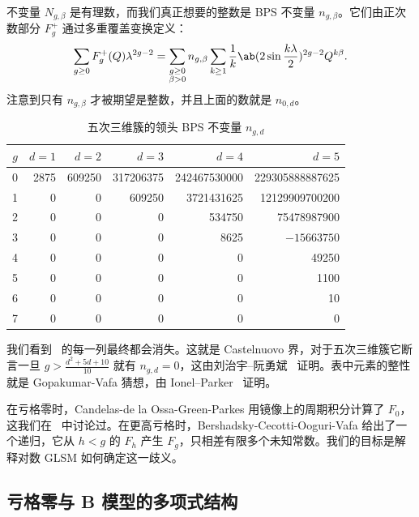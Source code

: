 \documentclass{amsart}
\theoremstyle{definition}
\theoremstyle{remark}
\theoremstyle{plain}
\theoremstyle{definition}
\theoremstyle{remark}
\newcommand{\1}{\mathbf{1}}
\newcommand{\2}{\mathbf{2}}
\newcommand{\3}{\mathbf{3}}
\begin{document}
不变量 \(N_{g,\beta}\) 是有理数，而我们真正想要的整数是 BPS 不变量 \(n_{g,\beta}\)。它们由正次数部分 \(F_g^+\) 通过多重覆盖变换定义：
\[ \sum_{g \geq 0} F_g^+(Q)\lambda^{2g-2} = \sum_{\substack{g \geq 0 \\ \beta > 0}} n_{g,\beta} \sum_{k \geq 1} \frac{1}{k} \ab(2 \sin \frac{k\lambda}{2})^{2g-2}Q^{k\beta}. \]
注意到只有 \(n_{g,\beta}\) 才被期望是整数，并且上面的数就是 \(n_{0,d}\)。

\begin{table}[htpb]
    \centering
    \caption{五次三维簇的领头 BPS 不变量 \(n_{g,d}\)}
    \label{tab:quinticbps}
    \begin{tabular}{crrrrr}
        \toprule
        \(g\) & \(d=1\) & \(d=2\) & \(d=3\) & \(d=4\) & \(d=5\) \\
        \midrule
        0 & 2875 & 609250 & 317206375 & 242467530000 & 229305888887625 \\
        1 & 0 & 0 & 609250 & 3721431625 & 12129909700200 \\
        2 & 0 & 0 & 0 & 534750 & 75478987900 \\
        3 & 0 & 0 & 0 & 8625 & \(-15663750\) \\
        4 & 0 & 0 & 0 & 0 & 49250 \\
        5 & 0 & 0 & 0 & 0 & 1100 \\
        6 & 0 & 0 & 0 & 0 & 10 \\
        7 & 0 & 0 & 0 & 0 & 0 \\
        \bottomrule
    \end{tabular}
\end{table}

我们看到~ 的每一列最终都会消失。这就是 Castelnuovo 界，对于五次三维簇它断言一旦 \(g > \frac{d^2+5d+10}{10}\) 就有 \(n_{g,d} = 0\)，这由刘治宇–阮勇斌~\cite{LiuRuanCastelnuovo} 证明。表中元素的整性就是 Gopakumar-Vafa 猜想，由 Ionel--Parker~\cite{IonelParker2018} 证明。

在亏格零时，Candelas-de la Ossa-Green-Parkes 用镜像上的周期积分计算了 \(F_0\)，这我们在~ 中讨论过。在更高亏格时，Bershadsky-Cecotti-Ooguri-Vafa 给出了一个递归，它从 \(h < g\) 的 \(F_h\) 产生 \(F_g\)，只相差有限多个未知常数。我们的目标是解释对数 GLSM 如何确定这一歧义。

\subsection{亏格零与 B 模型的多项式结构}%
\label{sub:Genus zero and the polynomial structure of the B-model}
\end{document}
